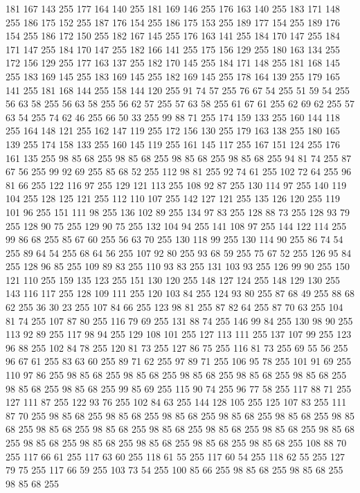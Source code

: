 181 167 143 255 177 164 140 255 181 169 146 255 176 163 140 255 183 171 148 255 186 175 152 255 187 176 154 255 186 175 153 255 189 177 154 255 189 176 154 255 186 172 150 255 182 167 145 255 176 163 141 255 184 170 147 255 184 171 147 255 184 170 147 255 182 166 141 255 175 156 129 255 180 163 134 255 172 156 129 255 177 163 137 255 182 170 145 255 184 171 148 255 181 168 145 255 183 169 145 255 183 169 145 255 182 169 145 255 178 164 139 255 179 165 141 255 181 168 144 255 158 144 120 255 91 74 57 255 76 67 54 255 51 59 54 255 56 63 58 255 56 63 58 255 56 62 57 255 57 63 58 255 61 67 61 255 62 69 62 255 57 63 54 255 74 62 46 255 66 50 33 255 99 88 71 255 174 159 133 255 160 144 118 255 164 148 121 255 162 147 119 255 172 156 130 255 179 163 138 255 180 165 139 255 174 158 133 255 160 145 119 255 161 145 117 255 167 151 124 255 176 161 135 255 98 85 68 255 98 85 68 255 98 85 68 255 98 85 68 255 94 81 74 255 87 67 56 255 99 92 69 255 85 68 52 255
112 98 81 255 92 74 61 255 102 72 64 255 96 81 66 255 122 116 97 255 129 121 113 255 108 92 87 255 130 114 97 255 140 119 104 255 128 125 121 255 112 110 107 255 142 127 121 255 135 126 120 255 119 101 96 255 151 111 98 255 136 102 89 255 134 97 83 255 128 88 73 255 128 93 79 255 128 90 75 255 129 90 75 255 132 104 94 255 141 108 97 255 144 122 114 255 99 86 68 255 85 67 60 255 56 63 70 255 130 118 99 255 130 114 90 255 86 74 54 255 89 64 54 255 68 64 56 255 107 92 80 255 93 68 59 255 75 67 52 255 126 95 84 255 128 96 85 255 109 89 83 255 110 93 83 255 131 103 93 255 126 99 90 255 150 121 110 255 159 135 123 255 151 130 120 255 148 127 124 255 148 129 130 255 143 116 117 255 128 109 111 255 120 103 84 255 124 93 80 255 87 68 49 255 88 68 62 255 36 30 23 255 107 84 66 255 123 98 81 255 87 82 64 255 87 70 63 255 104 81 74 255 107 87 80 255 116 79 69 255 131 88 74 255 146 99 84 255 130 98 90 255 113 92 89 255
117 98 94 255 129 108 101 255 127 113 111 255 137 107 99 255 123 96 88 255 102 84 78 255 120 81 73 255 127 86 75 255 116 81 73 255 69 55 56 255 96 67 61 255 83 63 60 255 89 71 62 255 97 89 71 255 106 95 78 255 101 91 69 255 110 97 86 255 98 85 68 255 98 85 68 255 98 85 68 255 98 85 68 255 98 85 68 255 98 85 68 255 98 85 68 255 99 85 69 255 115 90 74 255 96 77 58 255 117 88 71 255 127 111 87 255 122 93 76 255 102 84 63 255 144 128 105 255 125 107 83 255 111 87 70 255 98 85 68 255 98 85 68 255 98 85 68 255 98 85 68 255 98 85 68 255 98 85 68 255 98 85 68 255 98 85 68 255 98 85 68 255 98 85 68 255 98 85 68 255 98 85 68 255 98 85 68 255 98 85 68 255 98 85 68 255 98 85 68 255 98 85 68 255 108 88 70 255 117 66 61 255 117 63 60 255 118 61 55 255 117 60 54 255 118 62 55 255 127 79 75 255 117 66 59 255 103 73 54 255 100 85 66 255 98 85 68 255 98 85 68 255 98 85 68 255

